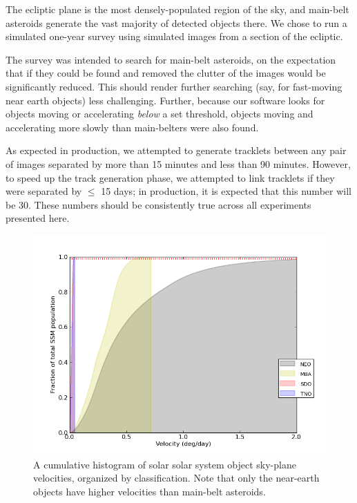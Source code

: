 \documentclass[12pt,preprint]{aastex}
\begin{document}
The ecliptic plane is the most densely-populated region of the sky,
and main-belt asteroids generate the vast majority of detected objects
there.  We chose to run a simulated one-year survey using simulated
images from a section of the ecliptic.  

The survey was intended to search for main-belt asteroids, on the
expectation that if they could be found and removed the clutter of the
images would be significantly reduced. This should render further
searching (say, for fast-moving near earth objects) less challenging.
Further, because our software looks for objects moving or accelerating
\textit{below} a set threshold, objects moving and accelerating more
slowly than main-belters were also found.


As expected in production, we attempted to generate tracklets between
any pair of images separated by more than 15 minutes and less than
90 minutes.  However, to speed up the track generation phase, we
attempted to link tracklets if they were separated by $\leq$ 15 days;
in production, it is expected that this number will be 30.  These
numbers should be consistently true across all experiments presented
here.


\label{velAccLimits}
\begin{figure}[ht!]
  \centering
  \includegraphics[width=13cm]{illustrations/mopsplots/aug2011/n_velocity.png}
  \caption{A cumulative histogram of solar solar system object
    sky-plane velocities, organized by classification.  Note that only
    the near-earth objects have higher velocities than main-belt
    asteroids.}
  \label{velSurvey}
\end{figure}
\end{document}
